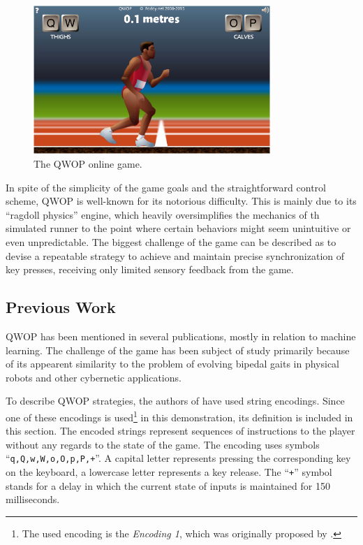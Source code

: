 \begin{figure}[ht]
	\centering
	\includegraphics[width=0.8\textwidth]{img/qwop.png}
	\caption[The QWOP online game.]{The QWOP online game. \cite{QwopWebsite}}
	\label{figure:QWOP}
\end{figure}

In spite of the simplicity of the game goals and the straightforward control scheme, QWOP is well-known for its notorious difficulty. This is mainly due to its ``ragdoll physics'' engine, which heavily oversimplifies the mechanics of th simulated runner to the point where certain behaviors might seem unintuitive or even unpredictable. \cite{QwopHomework} The biggest challenge of the game can be described as to devise a repeatable strategy to achieve and maintain precise synchronization of key presses, receiving only limited sensory feedback from the game.

\subsection{Previous Work}
QWOP has been mentioned in several publications, mostly in relation to machine learning. The challenge of the game has been subject of study primarily because of its appearent similarity to the problem of evolving bipedal gaits in physical robots and other cybernetic applications.

To describe QWOP strategies, the authors of \cite{EvolvingQwopGaits} have used string encodings. Since one of these encodings is used\footnote{The used encoding is the \textit{Encoding 1}, which was originally proposed by \cite{QwopEncoding}.} in this demonstration, its definition is included in this section. The encoded strings represent sequences of instructions to the player without any regards to the state of the game. The encoding uses symbols ``\texttt{q,Q,w,W,o,O,p,P,+}''. A capital letter represents pressing the corresponding key on the keyboard, a lowercase letter represents a key release. The ``\texttt{+}'' symbol stands for a delay in which the current state of inputs is maintained for 150 milliseconds. \cite{EvolvingQwopGaits}

